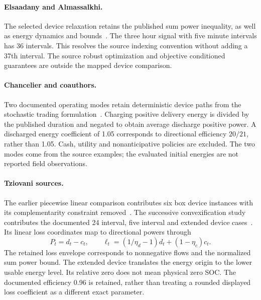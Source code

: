 \paragraph{Elsaadany and Almassalkhi.}
The selected device relaxation retains the published sum power inequality,
as well as energy dynamics and bounds~\cite{elsaadany2023battery}.
The three hour signal with five minute intervals has 36 intervals. This
resolves the source indexing convention without adding a 37th interval.
The source robust optimization and objective conditioned guarantees are
outside the mapped device comparison.

\paragraph{Chancelier and coauthors.}
Two documented operating modes retain deterministic device paths from the
stochastic trading formulation~\cite{chancelier2026optimal}. Charging
positive delivery energy is divided by the published duration and negated
to obtain average discharge positive power. A discharged energy coefficient
of 1.05 corresponds to directional efficiency $20/21$, rather than 1.05.
Cash, utility and nonanticipative policies are excluded. The two modes
come from the source examples; the evaluated initial energies are not
reported field observations.

\paragraph{Tziovani sources.}
The earlier piecewise linear comparison contributes six box device instances
with its complementarity constraint removed~\cite{tziovani2023investigating}.
The successive convexification study contributes the documented 24 interval,
five interval and extended device cases~\cite{tziovani2023successive}.
Its linear loss coordinates map to directional powers through
\begin{equation}
P_t=d_t-c_t,\qquad
\ell_t=(1/\eta_d-1)d_t+(1-\eta_c)c_t .\label{eq:loss_coordinates}
\end{equation}
The retained loss envelope corresponds to nonnegative flows and the
normalized sum power bound. The extended device translates the energy
origin to the lower usable energy level. Its relative zero does not mean
physical zero SOC. The documented efficiency 0.96 is retained, rather than
treating a rounded displayed loss coefficient as a different exact parameter.

